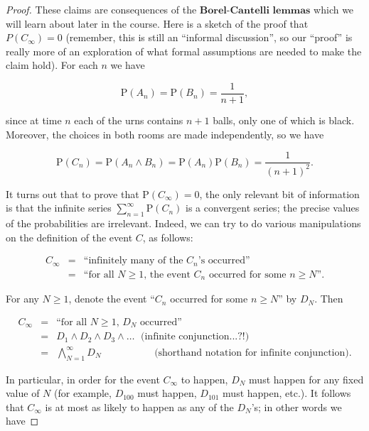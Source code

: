 \begin{proof}
These claims are consequences of the
$\textbf{Borel-Cantelli lemmas}$ which we will learn
about later in the course. Here is a sketch of the
proof that $P(C_\infty)=0$ (remember, this is still
an ``informal discussion'', so our ``proof'' is really
more of an exploration of what formal assumptions are
needed to make the claim hold). For each $n$ we have

\[
\mathrm{P}(A_n) = \mathrm{P}(B_n) = \frac{1}{n+1},
\]

\noindent since at time $n$ each of the urns contains $n+1$
balls, only one of which is black. Moreover, the
choices in both rooms are made independently, so we
have

\[
\mathrm{P}(C_n) = \mathrm{P}(A_n \wedge B_n) = \mathrm{P}(A_n) \mathrm{P}(B_n) = \frac{1}{(n+1)^2}.
\]

\noindent It turns out that to prove that
$\mathrm{P}(C_\infty)=0$, the only relevant bit of
information is that the infinite series
$\sum_{n=1}^\infty \mathrm{P}(C_n)$ is a convergent
series; the precise values of the probabilities are
irrelevant. Indeed, we can try to do various
manipulations on the definition of the event $C$, as
follows:

\begin{eqnarray*}
C_\infty &=& \textrm{``infinitely many of the $C_n$'s occurred''} \\
&=& \textrm{``for all $N\ge 1$, the event $C_n$ occurred for some $n\ge N$''.}
\end{eqnarray*}

\noindent For any $N\ge 1$, denote the event ``$C_n$ occurred
for some $n\ge N$'' by $D_N$. Then

\begin{eqnarray*}
C_\infty &=& \textrm{``for all $N\ge 1$, $D_N$ occurred''} \\
&=& D_1 \wedge D_2 \wedge D_3 \wedge \ldots \ \ \, \textrm{(infinite conjunction...?!)} \\
&=& \bigwedge_{N=1}^\infty D_N \quad \qquad \quad\ \ \ \ \ \ \textrm{(shorthand notation for infinite conjunction)}.
\end{eqnarray*}

\noindent In particular, in order for the event $C_\infty$ to
happen, $D_N$ must happen for any fixed value of $N$
(for example, $D_{100}$ must happen, $D_{101}$ must
happen, etc.). It follows that $C_\infty$ is at most
as likely to happen as any of the $D_N$'s; in other
words we have


\end{proof}
